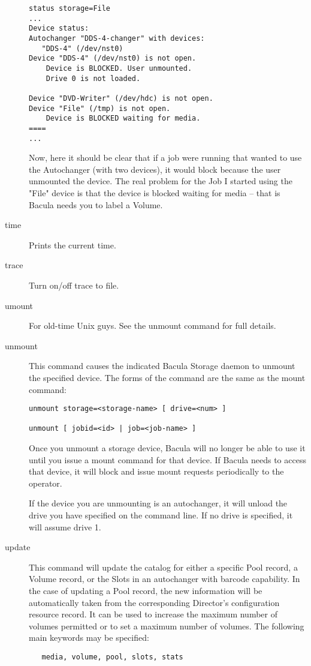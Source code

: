 \begin{description}
\footnotesize
\begin{verbatim}
status storage=File
...
Device status:
Autochanger "DDS-4-changer" with devices:
   "DDS-4" (/dev/nst0)
Device "DDS-4" (/dev/nst0) is not open.
    Device is BLOCKED. User unmounted.
    Drive 0 is not loaded.

Device "DVD-Writer" (/dev/hdc) is not open.
Device "File" (/tmp) is not open.
    Device is BLOCKED waiting for media.
====
...
\end{verbatim}
\normalsize

Now, here it should be clear that if a job were running that wanted
to use the Autochanger (with two devices), it would block because
the user unmounted the device. The real problem for the Job I started
using the "File" device is that the device is blocked waiting for
media -- that is Bacula needs you to label a Volume.

\item [time]
   Prints the current time.

\item [trace]
   Turn on/off trace to file.

\item [umount]
   For old-time Unix guys.  See the unmount command for full details.

\item [unmount]
   This command causes the indicated Bacula Storage  daemon to unmount the
   specified device. The forms of the command  are the same as the mount command:
\footnotesize
\begin{verbatim}
unmount storage=<storage-name> [ drive=<num> ]

unmount [ jobid=<id> | job=<job-name> ]
\end{verbatim}
\normalsize

   Once you unmount a storage device, Bacula will no longer be able to use
   it until you issue a mount command for that device. If Bacula needs to
   access that device, it will block and issue mount requests periodically
   to the operator.

   If the device you are unmounting is an autochanger, it will unload
   the drive you have specified on the command line. If no drive is 
   specified, it will assume drive 1.

\label{UpdateCommand}
\item [update]
   This command will update the catalog for either a specific Pool record, a Volume
   record, or the Slots in an  autochanger with barcode capability. In the case
   of updating a  Pool record, the new information will be automatically taken
   from  the corresponding Director's configuration resource record. It  can be
   used to increase the maximum number of volumes permitted or  to set a maximum
   number of volumes. The following main  keywords may be specified:  
\footnotesize
\begin{verbatim}
   media, volume, pool, slots, stats
\end{verbatim}
\normalsize


\end{description}
